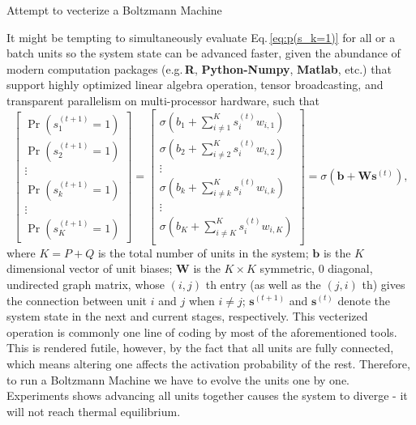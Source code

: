\documentclass[11pt]{article}
\newcommand{\vb}{\boldsymbol{b}}
\newcommand{\vs}{\boldsymbol{s}}
\newcommand{\mw}{\boldsymbol{W}}
\begin{document}
\begin{framedbox}[h]
  \caption{Attempt to vecterize a Boltzmann Machine} \label{box:vgbm}
  \centering
  \begin{minipage}{1\linewidth}
    \small It might be tempting to simultaneously evaluate Eq.\,\eqref{eq:p(s_k=1)} for all or a batch units so the system state can be advanced faster, given the abundance of modern computation packages
    (e.g.\,\textbf{R}, \textbf{Python-Numpy}, \textbf{Matlab}, etc.) that support highly optimized linear algebra operation, tensor broadcasting, and transparent parallelism on multi-processor hardware,
    such that
    \begin{equation*}
      \left[
        \begin{array}{c}
          \Pr(s_1^{(t+1)} = 1)   \\
          \Pr(s_2^{(t+1)} = 1)   \\
          \vdots \\
          \Pr(s_k^{(t+1)} = 1)   \\
          \vdots \\
          \Pr(s_K^{(t+1)} = 1)
        \end{array}
      \right] =
      \left[
        \begin{array}{c}
          \sigma(b_1 + \sum_{i \ne 1}^K{s_i^{(t)} w_{i,1}}) \\
          \sigma(b_2 + \sum_{i \ne 2}^K{s_i^{(t)} w_{i,2}}) \\
          \vdots \\
          \sigma(b_k + \sum_{i \ne k}^K{s_i^{(t)} w_{i,k}}) \\
          \vdots \\
          \sigma(b_K + \sum_{i \ne K}^K{s_i^{(t)} w_{i,K}}) \\
        \end{array}
      \right] = \sigma(\vb + \mw\vs^{(t)}),
    \end{equation*}
    where $K=P+Q$ is the total number of units in the system; $\vb$ is the $K$ dimensional vector of unit biases; $\mw$ is the $K \times K$ symmetric, 0 diagonal, undirected graph matrix, whose $(i, j)$ th
    entry (as well as the $(j, i)$ th) gives the connection between unit $i$ and $j$ when $i \ne j$; $\vs^{(t+1)}$ and $\vs^{(t)}$ denote the system state in the next and current stages, respectively. This
    vecterized operation is commonly one line of coding by most of the aforementioned tools. \\
    This is rendered futile, however, by the fact that all units are fully connected, which means altering one affects the activation probability of the rest. Therefore, to run a Boltzmann Machine we have to
    evolve the units one by one. Experiments shows advancing all units together causes the system to diverge - it will not reach thermal equilibrium.    
  \end{minipage}
\end{framedbox}
\end{document}
